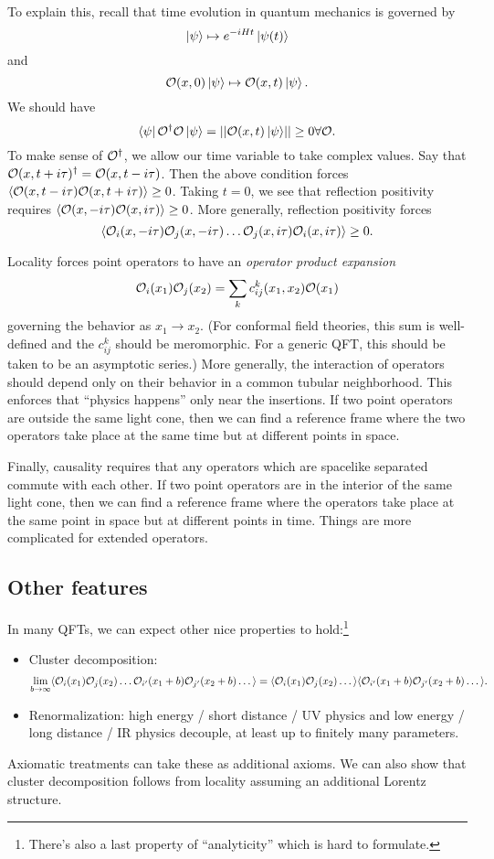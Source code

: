 To explain this, recall that time evolution in quantum mechanics is governed by
\[
	\left|{\psi}\right\rangle \mapsto e^{-i H t} \left|{\psi(t)}\right\rangle
\]
and
\[
	\mathcal{O}(x, 0) \left|{\psi}\right\rangle \mapsto \mathcal{O}(x, t) \left|{\psi}\right\rangle.
\]
We should have
\[
	\left\langle{\psi}\right| \mathcal{O}^\dagger \mathcal{O} \left|{\psi}\right\rangle = \left|\left|{\mathcal{O}(x, t) \left|{\psi}\right\rangle}\right|\right| \geq 0 \forall \mathcal{O}.
\]
To make sense of $\mathcal{O}^\dagger$, we allow our time variable to take complex values.
Say that $\mathcal{O}(x, t + i \tau)^\dagger = \mathcal{O}(x, t - i \tau)$.
Then the above condition forces $\langle \mathcal{O}(x, t - i \tau) \mathcal{O}(x, t + i \tau) \rangle \geq 0$.
Taking $t = 0$, we see that reflection positivity requires $\langle \mathcal{O}(x, -i \tau) \mathcal{O}(x, i \tau) \rangle \geq 0$.
More generally, reflection positivity forces
\[
	\langle \mathcal{O}_i(x, -i \tau) \mathcal{O}_j(x, -i \tau) \dots \mathcal{O}_j(x, i \tau) \mathcal{O}_i(x, i \tau) \rangle \geq 0.
\]

Locality forces point operators to have an \emph{operator product expansion}
\[
	\mathcal{O}_i(x_1) \mathcal{O}_j(x_2) = \sum_k c_{ij}^k(x_1, x_2) \mathcal{O}(x_1)
\]
governing the behavior as $x_1 \to x_2$.
(For conformal field theories, this sum is well-defined and the $c_{ij}^k$ should be meromorphic. For a generic QFT, this should be taken to be an asymptotic series.)
More generally, the interaction of operators should depend only on their behavior in a common tubular neighborhood. This enforces that ``physics happens'' only near the insertions.
If two point operators are outside the same light cone, then we can find a reference frame where the two operators take place at the same time but at different points in space.

Finally, causality requires that any operators which are spacelike separated commute with each other.
If two point operators are in the interior of the same light cone, then we can find a reference frame where the operators take place at the same point in space but at different points in time.
Things are more complicated for extended operators.

\subsection{Other features}

In many QFTs, we can expect other nice properties to hold:\footnote{There's also a last property of ``analyticity'' which is hard to formulate.}
\begin{itemize}
	\item Cluster decomposition:
	\[
	\lim_{b \to \infty} \langle \mathcal{O}_i(x_1) \mathcal{O}_j(x_2) \dots \mathcal{O}_{i'}(x_1 + b) \mathcal{O}_{j'}(x_2 + b) \dots \rangle = \langle \mathcal{O}_i(x_1) \mathcal{O}_j(x_2) \dots \rangle \langle \mathcal{O}_{i'}(x_1 + b) \mathcal{O}_{j'}(x_2 + b) \dots \rangle.
	\]
	\item Renormalization: high energy / short distance / UV physics and low energy / long distance / IR physics decouple, at least up to finitely many parameters.
\end{itemize}
Axiomatic treatments can take these as additional axioms. We can also show that cluster decomposition follows from locality assuming an additional Lorentz structure. 

